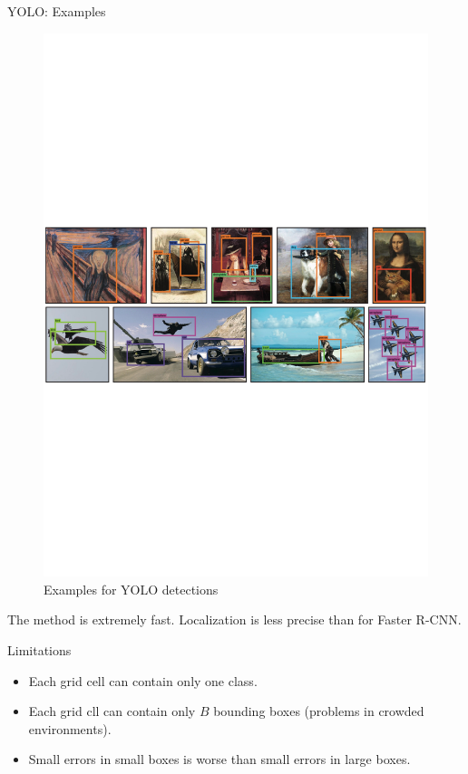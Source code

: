 \documentclass[xcolor=pdftex,dvipsnames,table]{beamer}
\begin{document}
\begin{frame}{YOLO: Examples}
\begin{figure}[htb]
   \centering
   \includegraphics[width=\textwidth]{../graphics/YOLO_ex.pdf}
   \caption{Examples for YOLO detections}
\end{figure}
The method is extremely fast. Localization is less precise than for Faster R-CNN. 
\end{frame}

\begin{frame}{Limitations}
\begin{itemize}
   \item Each grid cell can contain only one class.
   \item Each grid cll can contain only $B$ bounding boxes (problems in crowded environments). 
   \item Small errors in small boxes is worse than small errors in large boxes.
\end{itemize}
\end{frame}
\end{document}
